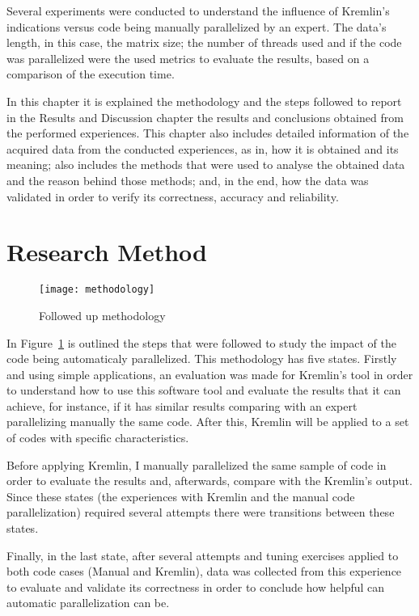 Several experiments were conducted to understand the influence of Kremlin's indications versus code being manually parallelized  by an expert. The data's length, in this case, the matrix size; the number of threads used and if the code was parallelized were the used metrics to evaluate the results, based on a comparison of the execution time.

In this chapter it is explained the methodology and the steps followed to report in the Results and Discussion chapter the results and conclusions obtained from the performed experiences. This chapter also includes  detailed information of the acquired data from the conducted experiences, as in, how it is obtained and its meaning; also includes the methods that were used to analyse the obtained data and the reason behind those methods; and, in the end, how the data was validated in order to verify its correctness, accuracy and reliability.



\section{Research Method}

\begin{figure}[thb]
	\begin{center}
		\leavevmode
		\texttt{[image: methodology]}
		\caption{Followed up methodology}
		\label{fig:workflow}
	\end{center}
\end{figure}


In Figure~\ref{fig:workflow} is outlined the steps that were followed to study the impact of the code being automaticaly parallelized. This methodology has five states. Firstly and using simple applications, an evaluation was made for Kremlin's tool in order to understand how to use this software tool and evaluate the results that it can achieve, for instance, if it has similar results comparing with an expert parallelizing manually the same code. After this, Kremlin will be applied to a set of codes with specific characteristics.

Before applying Kremlin, I manually parallelized the same sample of code in order to evaluate the results and, afterwards, compare with the Kremlin's output. Since these states (the experiences with Kremlin and the manual code parallelization) required several attempts there were transitions between these states. 

Finally, in the last state, after several attempts and tuning exercises applied to both code cases (Manual and Kremlin), data was collected from this experience to evaluate and validate its correctness in order to conclude how helpful can automatic parallelization can be.

